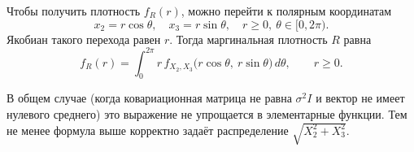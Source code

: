\documentclass[12pt]{article}
\begin{document}
    Чтобы получить плотность $f_R(r)$, можно перейти к полярным координатам
    \[
        x_2 = r \cos\theta,\quad
        x_3 = r \sin\theta,
        \quad r \ge 0,\ \theta \in [0,2\pi).
    \]
    Якобиан такого перехода равен $r$. Тогда маргинальная плотность $R$ равна
    \[
        f_R(r)
        = \int_{0}^{2\pi} r\,
        f_{X_2,X_3}\bigl(r\cos\theta,\ r\sin\theta\bigr)\,d\theta,
        \qquad r \ge 0.
    \]

    В общем случае (когда ковариационная матрица не равна $\sigma^2 I$ и вектор не имеет нулевого среднего) это выражение не упрощается в элементарные функции. Тем не менее формула выше корректно задаёт распределение $\sqrt{X_2^2 + X_3^2}$.
\end{document}
